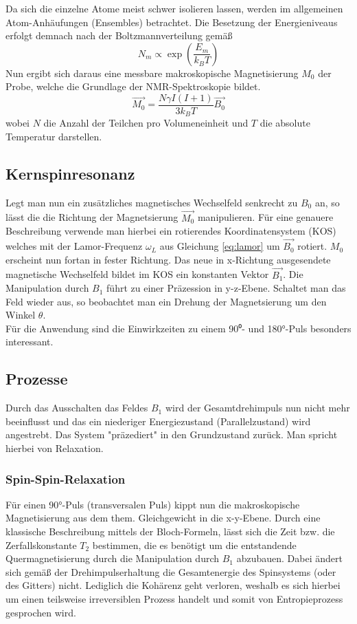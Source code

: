 Da sich die einzelne Atome meist schwer isolieren lassen, werden im allgemeinen Atom-Anhäufungen (Ensembles)
betrachtet. Die Besetzung der Energieniveaus erfolgt demnach nach der Boltzmannverteilung gemäß
\begin{equation}
    N_m \propto \exp\left(\frac{E_m}{k_BT}\right)
\end{equation}
Nun ergibt sich daraus eine messbare makroskopische Magnetisierung $M_0$ der Probe, welche die Grundlage der NMR-Spektroskopie bildet.
\begin{equation}
    \vec{M_0}=\frac{N\gamma I(I+1)}{3k_BT}\vec{B_0}
\end{equation}
wobei $N$ die Anzahl der Teilchen pro Volumeneinheit und $T$ die absolute Temperatur darstellen.
\subsection*{Kernspinresonanz}
Legt man nun ein zusätzliches magnetisches Wechselfeld senkrecht zu $B_0$ an, so lässt die die Richtung der Magnetsierung $\vec{M_0}$
manipulieren. Für eine genauere Beschreibung verwende man hierbei ein rotierendes Koordinatensystem (KOS) welches mit der 
Lamor-Frequenz $\omega_L$ aus Gleichung \ref{eq:lamor} um $\vec{B_0}$ rotiert. $M_0$ erscheint nun fortan in fester Richtung.
Das neue in x-Richtung ausgesendete magnetische Wechselfeld bildet im KOS ein konstanten Vektor $\vec{B_1}$.
Die Manipulation durch $B_1$ führt zu einer Präzession in y-z-Ebene. Schaltet man das Feld wieder aus, so beobachtet man ein Drehung
der Magnetsierung um den Winkel $\theta$.\\
Für die Anwendung sind die Einwirkzeiten zu einem 90⁰- und 180°-Puls besonders interessant.
\subsection{Prozesse}
Durch das Ausschalten das Feldes $B_1$ wird der Gesamtdrehimpuls nun nicht mehr beeinflusst und das ein niederiger Energiezustand
(Parallelzustand) wird angestrebt. Das System "präzediert" in den Grundzustand zurück. Man spricht hierbei von Relaxation.
\subsubsection{Spin-Spin-Relaxation}
Für einen 90°-Puls (transversalen Puls) kippt nun die makroskopische Magnetisierung aus dem them. Gleichgewicht in die x-y-Ebene.
Durch eine klassische Beschreibung mittels der Bloch-Formeln, lässt sich die Zeit bzw. die Zerfallskonstante $T_2$ bestimmen,
die es benötigt um die entstandende Quermagnetisierung durch die Manipulation durch $B_1$ abzubauen.
Dabei ändert sich gemäß der Drehimpulserhaltung die Gesamtenergie des Spinsystems (oder des Gitters) nicht. Lediglich die Kohärenz geht verloren, weshalb
es sich hierbei um einen teilsweise irreversiblen Prozess handelt und somit von Entropieprozess gesprochen wird.\\


